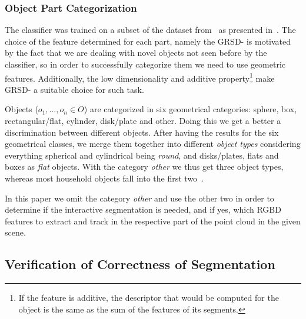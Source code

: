 
\subsubsection{Object Part Categorization}
\label{sec:part-feature}
The classifier was trained on a subset of the dataset from~\cite{lai11db} 
as presented in~\cite{marton12SC}.
The choice of the feature determined for each part, namely the GRSD- is motivated 
by the fact that we are dealing with novel objects not seen before 
by the classifier, so in order to successfully categorize them we need to use geometric features.
Additionally, the low dimensionality and additive property\footnote{If the feature is additive,
the descriptor that would be computed for the object is the same as the sum of the features of its segments.} make GRSD- a suitable choice for such task.

Objects ($o_{1}, \dots, o_{n} \in O$) are categorized in six geometrical categories: sphere, box, rectangular/flat, cylinder, disk/plate and other.
Doing this we get a better a discrimination between different objects. After having the results for the 
six geometrical classes, we merge them together into different \emph{object types} considering everything spherical and cylindrical being
\emph{round}, and disks/plates, flats and boxes as \emph{flat} objects.
With the category \emph{other} we thus get three object types, whereas most
household objects fall into the first two~\cite{marton11ijrr}.

In this paper we omit the category \emph{other} and use the other two in order
to determine if the interactive segmentation is needed, and if yes, which RGBD features 
to extract and track in the respective part of the point cloud in the given scene.


\subsection{Verification of Correctness of Segmentation}
\label{sec:probabilities}

